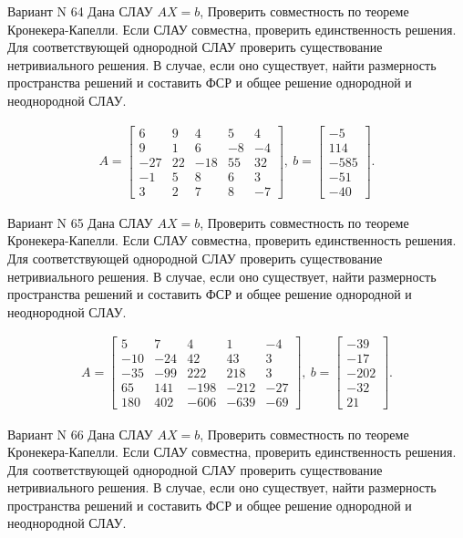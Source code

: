 \documentclass[11pt]{report}
\begin{document}
Вариант N 64
Дана СЛАУ $AX = b$,
Проверить совместность по теореме Кронекера-Капелли. Если СЛАУ совместна, проверить единственность решения.
Для соответствующей однородной СЛАУ проверить существование нетривиального решения. В случае, если оно существует,
найти размерность пространства решений и составить ФСР и общее решение однородной  и неоднородной СЛАУ.


\begin{align*}
 A = \left[\begin{matrix}6 & 9 & 4 & 5 & 4\\9 & 1 & 6 & -8 & -4\\-27 & 22 & -18 & 55 & 32\\-1 & 5 & 8 & 6 & 3\\3 & 2 & 7 & 8 & -7\end{matrix}\right],
\ b = \left[\begin{matrix}-5\\114\\-585\\-51\\-40\end{matrix}\right]. 
 \end{align*}

Вариант N 65
Дана СЛАУ $AX = b$,
Проверить совместность по теореме Кронекера-Капелли. Если СЛАУ совместна, проверить единственность решения.
Для соответствующей однородной СЛАУ проверить существование нетривиального решения. В случае, если оно существует,
найти размерность пространства решений и составить ФСР и общее решение однородной  и неоднородной СЛАУ.


\begin{align*}
 A = \left[\begin{matrix}5 & 7 & 4 & 1 & -4\\-10 & -24 & 42 & 43 & 3\\-35 & -99 & 222 & 218 & 3\\65 & 141 & -198 & -212 & -27\\180 & 402 & -606 & -639 & -69\end{matrix}\right],
\ b = \left[\begin{matrix}-39\\-17\\-202\\-32\\21\end{matrix}\right]. 
 \end{align*}

Вариант N 66
Дана СЛАУ $AX = b$,
Проверить совместность по теореме Кронекера-Капелли. Если СЛАУ совместна, проверить единственность решения.
Для соответствующей однородной СЛАУ проверить существование нетривиального решения. В случае, если оно существует,
найти размерность пространства решений и составить ФСР и общее решение однородной  и неоднородной СЛАУ.
\end{document}
